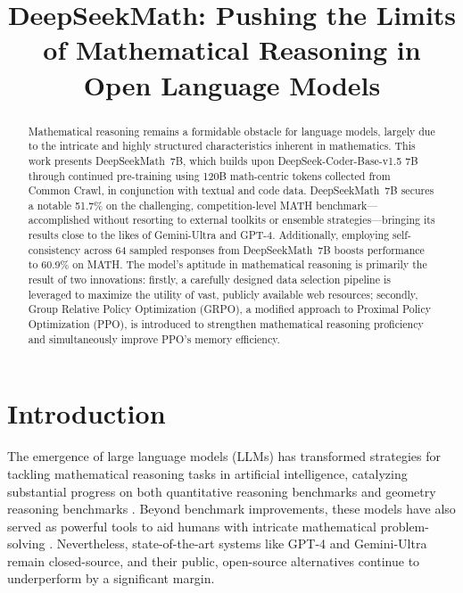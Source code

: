 \title{DeepSeekMath: Pushing the Limits of Mathematical Reasoning in Open Language Models}

\begin{abstract}
Mathematical reasoning remains a formidable obstacle for language models, largely due to the intricate and highly structured characteristics inherent in mathematics. This work presents DeepSeekMath~7B, which builds upon DeepSeek-Coder-Base-v1.5 7B through continued pre-training using 120B math-centric tokens collected from Common Crawl, in conjunction with textual and code data. DeepSeekMath~7B secures a notable 51.7\% on the challenging, competition-level MATH benchmark—accomplished without resorting to external toolkits or ensemble strategies—bringing its results close to the likes of Gemini-Ultra and GPT-4. Additionally, employing self-consistency across 64 sampled responses from DeepSeekMath~7B boosts performance to 60.9\% on MATH. The model’s aptitude in mathematical reasoning is primarily the result of two innovations: firstly, a carefully designed data selection pipeline is leveraged to maximize the utility of vast, publicly available web resources; secondly, Group Relative Policy Optimization (GRPO), a modified approach to Proximal Policy Optimization (PPO), is introduced to strengthen mathematical reasoning proficiency and simultaneously improve PPO's memory efficiency.
\end{abstract}

\section{Introduction}

The emergence of large language models (LLMs) has transformed strategies for tackling mathematical reasoning tasks in artificial intelligence, catalyzing substantial progress on both quantitative reasoning benchmarks \citep{MATH} and geometry reasoning benchmarks \citep{trinh2024solving}. Beyond benchmark improvements, these models have also served as powerful tools to aid humans with intricate mathematical problem-solving \citep{tao}. Nevertheless, state-of-the-art systems like GPT-4 \citep{gpt4} and Gemini-Ultra \citep{gemini} remain closed-source, and their public, open-source alternatives continue to underperform by a significant margin.


